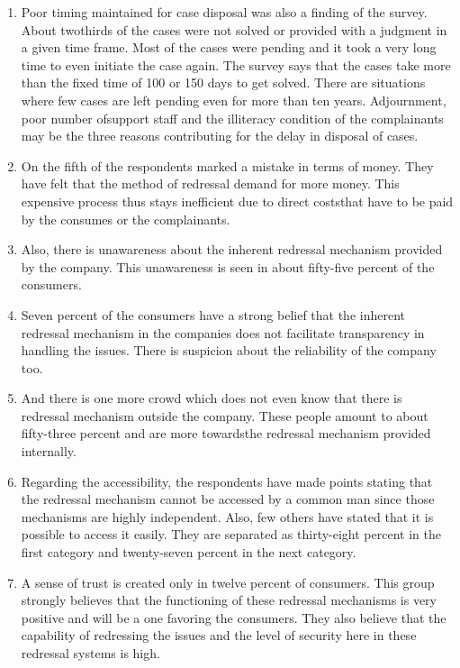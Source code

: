 \begin{multicols}{2}
\begin{enumerate}[label=$\bullet$]
\item Poor timing maintained for case disposal was also a finding of the survey. About twothirds of the cases were not solved or provided with a judgment in a given time frame.
Most of the cases were pending and it took a very long time to even initiate the case
again. The survey says that the cases take more than the fixed time of 100 or 150 days
to get solved. There are situations where few cases are left pending even for more than
ten years. Adjournment, poor number ofsupport staff and the illiteracy condition of the
complainants may be the three reasons contributing for the delay in disposal of cases.

\item On the fifth of the respondents marked a mistake in terms of money. They have felt that
the method of redressal demand for more money. This expensive process thus stays
inefficient due to direct coststhat have to be paid by the consumes or the complainants.

\item Also, there is unawareness about the inherent redressal mechanism provided by the
company. This unawareness is seen in about fifty-five percent of the consumers.

\item Seven percent of the consumers have a strong belief that the inherent redressal
mechanism in the companies does not facilitate transparency in handling the issues.
There is suspicion about the reliability of the company too.

\item And there is one more crowd which does not even know that there is redressal
mechanism outside the company. These people amount to about fifty-three percent and
are more towardsthe redressal mechanism provided internally.

\item Regarding the accessibility, the respondents have made points stating that the redressal
mechanism cannot be accessed by a common man since those mechanisms are highly
independent. Also, few others have stated that it is possible to access it easily. They are
separated as thirty-eight percent in the first category and twenty-seven percent in the
next category.

\item A sense of trust is created only in twelve percent of consumers. This group strongly
believes that the functioning of these redressal mechanisms is very positive and will be
a one favoring the consumers. They also believe that the capability of redressing the
issues and the level of security here in these redressal systems is high.


\end{enumerate}
\end{multicols}
